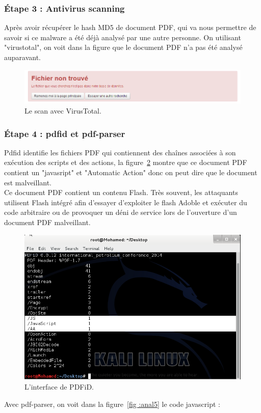 \subsubsection*{Étape 3 : Antivirus scanning}
Après avoir récupérer le hash MD5 de document PDF, qui va nous permettre de savoir si ce malware a été déjà analysé par une autre personne. On utilisant "virustotal", on voit dans la figure que le document PDF n'a pas été analysé auparavant.
\begin{figure}[H]
\begin{center}
\includegraphics[scale=0.7]{Figures/anal3.png}
\caption{Le scan avec VirusTotal.}
\label{fig :anal3} 
\end{center}
\end{figure}
\subsubsection*{Étape 4 : pdfid et pdf-parser}
Pdfid identifie les fichiers PDF qui contiennent des chaînes associées à son exécution des scripts et des actions, la figure~\ref{fig :anal4} montre que ce document PDF contient un "javasript" et "Automatic Action" donc on peut dire que le document est malveillant.\\
Ce document PDF contient un contenu Flash. Très souvent, les attaquants utilisent Flash intégré afin d'essayer d'exploiter le flash Adoble et exécuter du code arbitraire ou de provoquer un déni de service lors de l'ouverture d'un document PDF malveillant.
\begin{figure}[H]
\begin{center}
\includegraphics[scale=0.5]{Figures/anal4.png}
\caption{L'interface de PDFiD.}
\label{fig :anal4} 
\end{center}
\end{figure}
Avec pdf-parser, on voit dans la figure~\ref{fig :anal5} le code javascript :

